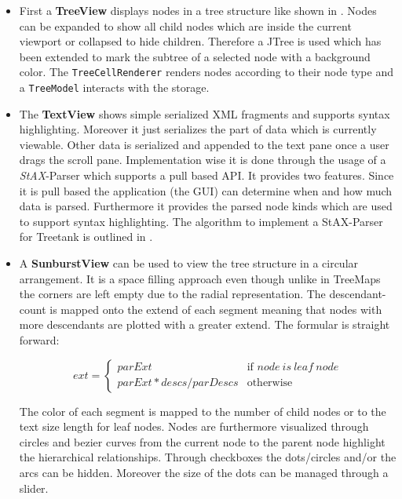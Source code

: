\begin{itemize}
\item
First a \textbf{TreeView} displays nodes in a tree structure like shown in . Nodes can be expanded to show all child nodes which are inside the current viewport or collapsed to hide children. Therefore a JTree is used which has been extended to mark the subtree of a selected node with a background color. The \texttt{TreeCellRenderer} renders nodes according to their node type and a \texttt{TreeModel} interacts with the storage. 

\item
The \textbf{TextView} shows simple serialized XML fragments and supports syntax highlighting. Moreover it just serializes the part of data which is currently viewable. Other data is serialized and appended to the text pane once a user drags the scroll pane. Implementation wise it is done through the usage of a \emph{StAX}-Parser which supports a pull based API. It provides two features. Since it is pull based the application (the GUI) can determine when and how much data is parsed. Furthermore it provides the parsed node kinds which are used to support syntax highlighting. The algorithm to implement a StAX-Parser for Treetank is outlined in . 

\item
A \textbf{SunburstView} can be used to view the tree structure in a circular arrangement. It is a space filling approach even though unlike in TreeMaps the corners are left empty due to the radial representation. The descendant-count is mapped onto the extend of each segment meaning that nodes with more descendants are plotted with a greater extend. The formular is straight forward:

\begin{equation}
ext = \left\{ \begin{array}{cl}
parExt & \textrm{if }node\ is\ leaf\ node\\
parExt * descs / parDescs & \textrm{otherwise}\end{array}\right.
\end{equation}


The color of each segment is mapped to the number of child nodes or to the text size length for leaf nodes. Nodes are furthermore visualized through circles and bezier curves from the current node to the parent node highlight the hierarchical relationships. Through checkboxes the dots/circles and/or the arcs can be hidden. Moreover the size of the dots can be managed through a slider.

\end{itemize}

